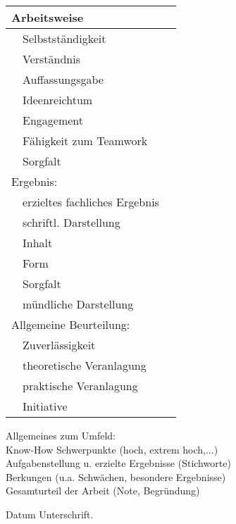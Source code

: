 \documentclass[german,a4paper]{article}
\begin{document}
  \begin{tabular}{|ll|p{2cm}|}
\hline 
\multicolumn{2}{|l}{Arbeitsweise}&\\\hline
  &  \quad Selbstständigkeit&\\\hline
  &  \quad Verständnis&\\\hline
  &  \quad Auffassungsgabe&\\\hline
&  Ideenreichtum&\\\hline
&  Engagement&\\\hline
&  Fähigkeit zum Teamwork&\\\hline
&  Sorgfalt&\\\hline\hline

\multicolumn{2}{|l}{Ergebnis:}&\\\hline
&  erzieltes fachliches Ergebnis&\\\hline
&  schriftl. Darstellung&\\\hline
  &  \quad Inhalt&\\\hline
  &  \quad Form&\\\hline
&  Sorgfalt&\\\hline
&  mündliche Darstellung&\\\hline\hline

\multicolumn{2}{|l}{Allgemeine Beurteilung:}&\\
&  Zuverlässigkeit&\\\hline
&  theoretische Veranlagung&\\\hline
&  praktische Veranlagung&\\\hline
&  Initiative&\\\hline
  \end{tabular}    
  

Allgemeines zum Umfeld:\\
Know-How Schwerpunkte (hoch, extrem hoch,...)\\[2cm]
Aufgabenstellung u. erzielte Ergebnisse (Stichworte)\\[2cm]
Berkungen (u.a. Schwächen, besondere Ergebnisse)\\[2cm]


Gesamturteil der Arbeit (Note, Begründung)

Datum Unterschrift.
\end{document}
